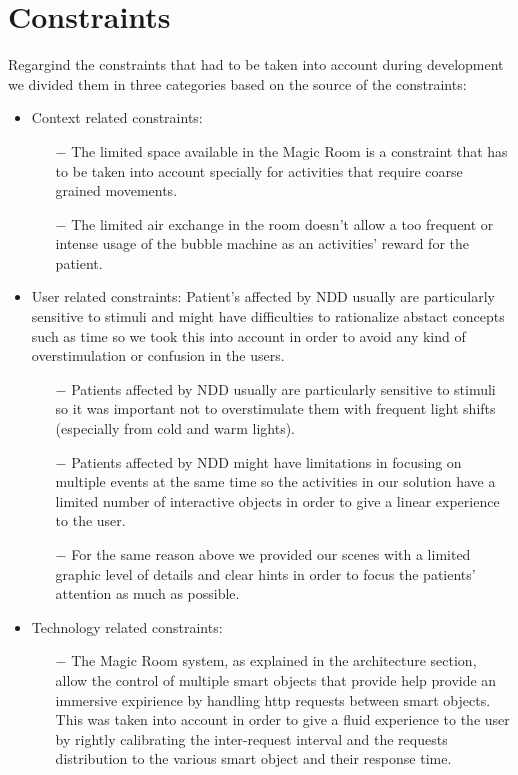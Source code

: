 \section{Constraints}
	Regargind the constraints that had to be taken into account during development we divided them in three categories based on the source of the constraints:
	\begin{itemize}
		\item Context related constraints:
		\begin{itemize}
			\item[$ - $] The limited space available in the Magic Room is a constraint that has to be taken into account specially for activities that require coarse grained movements.
			\item[$ - $] The limited air exchange in the room doesn't allow a too frequent or intense usage of the bubble machine as an activities' reward for the patient.
		\end{itemize}
	\end{itemize}
	\begin{itemize}
		\item User related constraints:
		Patient's affected by NDD usually are particularly sensitive to stimuli and might have difficulties to rationalize abstact concepts such as time so we took this into account in order to avoid any kind of overstimulation or confusion in the users. 
		\begin{itemize}
			\item[$ - $] Patients affected by NDD usually are particularly sensitive to stimuli so it was important not to overstimulate them with frequent light shifts (especially from cold and warm lights).
			\item[$ - $] Patients affected by NDD might have limitations in focusing on multiple events at the same time so the activities in our solution have a limited number of interactive objects in order to give a linear experience to the user.
			\item[$ - $] For the same reason above we provided our scenes with a limited graphic level of details and clear hints in order to focus the patients' attention as much as possible.
		\end{itemize}
	\end{itemize}
	\begin{itemize}
		\item Technology related constraints:
		\begin{itemize}
			\item[$ - $] The Magic Room system, as explained in the architecture section, allow the control of multiple smart objects that provide help provide an immersive expirience by handling http requests between smart objects. This was taken into account in order to give a fluid experience to the user by rightly calibrating the inter-request interval and the requests distribution to the various smart object and their response time.
		\end{itemize}
	\end{itemize}
